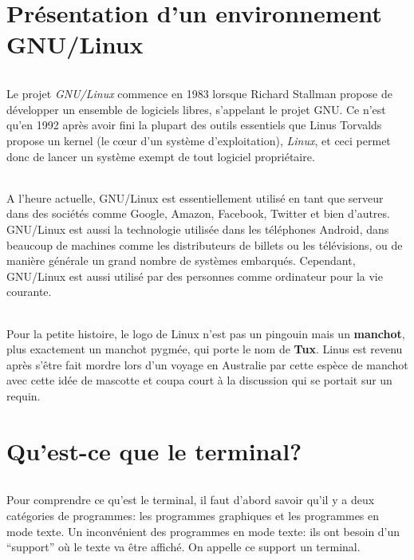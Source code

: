 \part{Présentation d'un environnement GNU/Linux}

\paragraph{}
Le projet \textit{GNU/Linux} commence en 1983 lorsque Richard Stallman propose
de développer un ensemble de logiciels libres, s'appelant le projet GNU. Ce
n'est qu'en 1992 après avoir fini la plupart des outils essentiels que Linus
Torvalds propose un kernel (le cœur d'un système d'exploitation),
\textit{Linux}, et ceci permet donc de lancer un système exempt de tout
logiciel propriétaire.

\paragraph{}
A l'heure actuelle, GNU/Linux est essentiellement utilisé en tant que serveur
dans des sociétés comme Google, Amazon, Facebook, Twitter et bien d'autres.
GNU/Linux est aussi la technologie utilisée dans les téléphones Android, dans
beaucoup de machines comme les distributeurs de billets ou les télévisions, ou
de manière générale un grand nombre de systèmes embarqués. Cependant, GNU/Linux
est aussi utilisé par des personnes comme ordinateur pour la vie courante.

\paragraph{}
Pour la petite histoire, le logo de Linux n'est pas un pingouin mais un
\textbf{manchot}, plus exactement un manchot pygmée, qui porte le nom de
\textbf{Tux}. Linus est revenu après s'être fait mordre lors d'un voyage en
Australie par cette espèce de manchot avec cette idée de mascotte et coupa
court à la discussion qui se portait sur un requin.

\newpage
\part{Qu'est-ce que le terminal?}

\paragraph{} Pour comprendre ce qu'est le terminal, il faut d'abord savoir
qu'il y a deux catégories de programmes: les programmes graphiques et les
programmes en mode texte. Un inconvénient des programmes en mode texte: ils ont
besoin d'un ``support'' où le texte va être affiché. On appelle ce support un
terminal.

